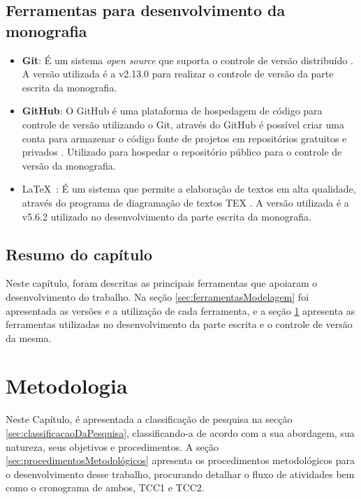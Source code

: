 \section{Ferramentas para desenvolvimento da monografia}
\label{sec:ferramentasDesenvolvimento}

\begin{itemize}
	
	\item \textbf{Git}: É um sistema \textit{open source} que suporta o controle de versão distribuído \cite{git}. A versão utilizada é a v2.13.0 para realizar o controle de versão da parte escrita da monografia. 
	
	\item \textbf{GitHub}: O GitHub é uma plataforma de hospedagem de código para controle de versão utilizando o Git, através do GitHub é possível criar uma conta para armazenar o código fonte de projetos em repositórios gratuitos e privados \cite{github}. Utilizado para hospedar o repositório público para o controle de versão da monografia. 
	
	\item \LaTeX\ : É um sistema que permite a elaboração de textos em alta qualidade, através do programa de diagramação de textos TEX \cite{latex}. A versão utilizada é a v5.6.2 utilizado no desenvolvimento da parte escrita da monografia. 
	
\end{itemize}

\section{Resumo do capítulo}

Neste capítulo, foram descritas as principais ferramentas que apoiaram o desenvolvimento do trabalho. Na seção \ref{sec:ferramentasModelagem} foi apresentada as versões e a utilização de cada ferramenta, e a seção \ref{sec:ferramentasDesenvolvimento} apresenta as ferramentas utilizadas no desenvolvimento da parte escrita e o controle de versão da mesma. 

\chapter{Metodologia}
\label{chap:metodologia}

Neste Capítulo, é apresentada a classificação de pesquisa na secção \ref{sec:classificacaoDaPesquisa}, classificando-a de acordo com a sua abordagem, sua natureza, seus objetivos e procedimentos. A seção \ref{sec:procedimentosMetodológicos} apresenta os procedimentos metodológicos para o desenvolvimento desse trabalho, procurando detalhar o fluxo de atividades bem como o cronograma de ambos, TCC1 e TCC2.  


